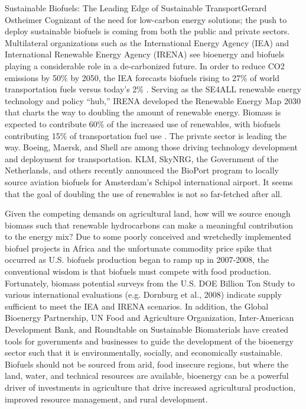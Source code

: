 \documentclass{papertex}
\begin{document}
\begin{news}{2}{Sustainable Biofuels: The Leading Edge of Sustainable 
    Transport}{Gerard Ostheimer}{}{}
Cognizant of the need for low-carbon energy solutions; the push to deploy 
sustainable biofuels is coming from both the public and private sectors. 
Multilateral organizations such as the International Energy Agency (IEA) and 
International Renewable Energy Agency (IRENA) see bioenergy and biofuels 
playing a considerable role in a de-carbonized future. In order to reduce CO2 
emissions by 50\% by 2050, the IEA forecasts biofuels rising to 27\% of world 
transportation fuels versus today’s 2\% . Serving as the SE4ALL renewable 
energy technology and policy “hub,” IRENA developed the Renewable Energy Map 
2030 that charts the way to doubling the amount of renewable energy. Biomass 
is expected to contribute 60\% of the increased use of renewables, with 
biofuels contributing 15\% of transportation fuel use . The private sector is 
leading the way. Boeing, Maersk, and Shell are among those driving technology 
development and deployment for transportation. KLM, SkyNRG, the Government of 
the Netherlands, and others recently announced the BioPort program to locally 
source aviation biofuels for Amsterdam’s Schipol international airport. It 
seems that the goal of doubling the use of renewables is not so far-fetched 
after all.

Given the competing demands on agricultural land, how will we source enough 
biomass such that renewable hydrocarbons can make a meaningful contribution to 
the energy mix? Due to some poorly conceived and wretchedly implemented biofuel 
projects in Africa and the unfortunate commodity price spike that occurred as 
U.S. biofuels production began to ramp up in 2007-2008, the conventional 
wisdom is that biofuels must compete with food production. Fortunately, 
biomass potential surveys from the U.S. DOE Billion Ton Study to various 
international evaluations (e.g. Dornburg et al., 2008) indicate supply 
sufficient to meet the IEA and IRENA scenarios. In addition, the Global 
Bioenergy Partnership, UN Food and Agriculture Organization, Inter-American 
Development Bank, and Roundtable on Sustainable Biomaterials have created 
tools for governments and businesses to guide the development of the bioenergy 
sector such that it is environmentally, socially, and economically sustainable. 
Biofuels should not be sourced from arid, food insecure regions, but where the 
land, water, and technical resources are available, bioenergy can be a 
powerful driver of investments in agriculture that drive increased 
agricultural production, improved resource management, and rural development.


\end{news}
\end{document}
